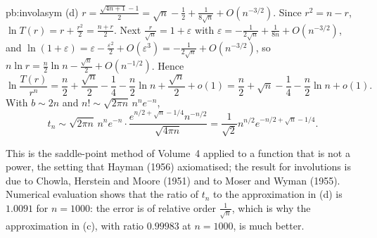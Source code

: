\begin{solution}{pb:involasym}
(d) $r=\frac{\sqrt{4n+1}-1}2=\sqrt n-\frac12+\frac1{8\sqrt n}+O(n^{-3/2})$. Since $r^2=n-r$, $\ln T(r)=r+\frac{r^2}2=\frac{n+r}2$. Next $\frac r{\sqrt n}=1+\varepsilon$ with
$\varepsilon=-\frac1{2\sqrt n}+\frac1{8n}+O(n^{-3/2})$, and $\ln(1+\varepsilon)=\varepsilon-\frac{\varepsilon^2}2+O(\varepsilon^3)=-\frac1{2\sqrt n}+O(n^{-3/2})$, so $n\ln r=\frac n2\ln n-\frac{\sqrt n}2+O(n^{-1/2})$. Hence
\[
\ln\frac{T(r)}{r^n}=\frac n2+\frac{\sqrt n}2-\frac14-\frac n2\ln n+\frac{\sqrt n}2+o(1)=\frac n2+\sqrt n-\frac14-\frac n2\ln n+o(1).
\]
With $b\sim2n$ and $n!\sim\sqrt{2\pi n}\,n^ne^{-n}$,
\[
t_n\sim\sqrt{2\pi n}\,n^ne^{-n}\cdot\frac{e^{n/2+\sqrt n-1/4}n^{-n/2}}{\sqrt{4\pi n}}=\frac1{\sqrt2}n^{n/2}e^{-n/2+\sqrt n-1/4}.
\]

\leads This is the saddle-point method of Volume~4 applied to a function that is not a power, the setting that Hayman (1956) axiomatised; the result for
involutions is due to Chowla, Herstein and Moore (1951) and to Moser and Wyman (1955). Numerical evaluation shows that the ratio of $t_n$ to the approximation
in (d) is $1.0091$ for $n=1000$: the error is of relative order $\frac1{\sqrt n}$, which is why the approximation in (c), with ratio $0.99983$ at $n=1000$, is much better.
\end{solution}

